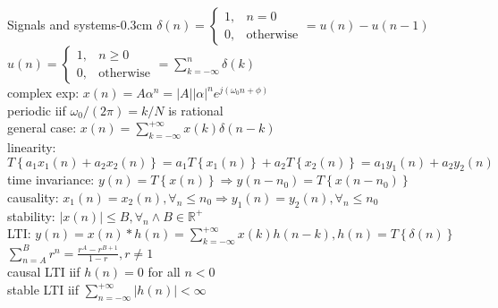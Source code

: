\documentclass[10pt,3col]{cheatsheet}
\begin{document}
\begin{multicols*}{3}

\begin{cheatsheetbox}{Signals and systems}{-0.3cm}
	$\delta(n) = \begin{cases} 1, & n = 0\\ 0, & \mathrm{otherwise}\end{cases} = u(n) - u(n - 1)$ \\
    $u(n) = \begin{cases} 1, & n \geq 0\\ 0, & \mathrm{otherwise}\end{cases} = \sum_{k = -\infty}^n \delta(k)$ \\
    complex exp: $x(n) = A\alpha^n = |A||\alpha|^ne^{j(\omega_0 n + \phi)}$\\
    periodic iif $\omega_0 / (2 \pi) = k/N$ is rational \\
    general case: $x(n) = \sum_{k = -\infty}^{+\infty} x(k) \delta(n - k)$ \\
    linearity: $T\left\{a_1x_1(n) + a_2x_2(n)\right\} = a_1T\left\{x_1(n)\right\} + a_2T\left\{x_2(n)\right\} = a_1y_1(n) + a_2y_2(n)$ \\
    time invariance: $y(n) = T\left\{x(n)\right\} \Rightarrow y(n - n_0) = T\left\{x(n - n_0)\right\}$ \\
    causality: $x_1(n) = x_2(n), \forall_n \leq n_0 \Rightarrow y_1(n) = y_2(n), \forall_n \leq n_0$ \\
    stability: $|x(n)| \leq B, \forall_n \wedge B \in \mathbb{R}^+ $\\
    LTI: $y(n) = x(n) \ast h(n) = \sum_{k = -\infty}^{+\infty} x(k) h(n - k), h(n) = T\left\{\delta(n)\right\}$\\
    $\sum_{n = A}^{B} r^n = \frac{r^A - r^{B + 1}}{1 - r}, r \neq 1$\\
    causal LTI iif $h(n) = 0$ for all $n < 0$ \\
    stable LTI iif $\sum_{n = -\infty}^{+\infty} |h(n)| < \infty$
\end{cheatsheetbox}


\end{multicols*}
\end{document}
